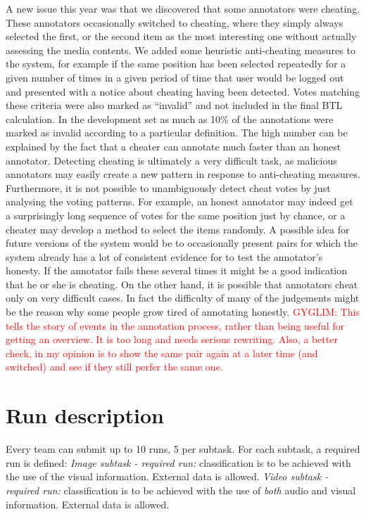\documentclass[sigconf]{acmart-me}
\begin{document}
A new issue this year was that we discovered that some annotators were cheating.
These annotators occasionally switched to cheating, where they simply always selected the first, or the second item as the most interesting one without actually assessing the media contents.
We added some heuristic anti-cheating measures to the system, for example if the same position has been selected repeatedly for a given number of times in a given period of time that user would be logged out and presented with a notice about cheating having been detected.
Votes matching these criteria were also marked as ``invalid'' and not included in the final BTL calculation.
In the development set as much as 10\% of the annotations were marked as invalid according to a particular definition.
The high number can be explained by the fact that a cheater can annotate much faster than an honest annotator.
Detecting cheating is ultimately a very difficult task, as malicious annotators may easily create a new pattern in response to anti-cheating measures.
Furthermore, it is not possible to unambiguously detect cheat votes by just analysing the voting patterns.  For example, an honest annotator may indeed get a surprisingly long sequence of votes for the same position just by chance, or a cheater may develop a method to select the items randomly.
A possible idea for future versions of the system would be to occasionally present pairs for which the system already has a lot of consistent evidence for to test the annotator's honesty.
If the annotator fails these several times it might be a good indication that he or she is cheating.
On the other hand, it is possible that annotators cheat only on very difficult cases.  In fact the difficulty of many of the judgements might be the reason why some people grow tired of annotating honestly.
\textcolor{red}{GYGLIM: This tells the story of events in the annotation process, rather than being useful for getting an overview. It is too long and needs serious rewriting.
Also, a better check, in my opinion is to show the same pair again at a later time (and switched) and see if they still perfer the same one.}


\section{Run description}

Every team can submit up to 10 runs, 5 per subtask. For each subtask, a required run is defined: \emph{Image subtask - required run:} classification is to be achieved with the use of the visual information. External data is allowed. \emph{Video subtask - required run:} classification is to be achieved with the use of \emph{both} audio and visual information. External data is allowed.
\end{document}
